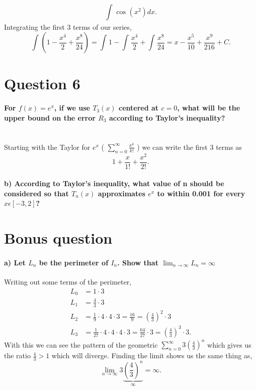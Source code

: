 \documentclass{report}
\begin{document}
\[
\int_{  }^{  } \cos^{  } \left( x^2 \right) dx
.\] 
Integrating the first 3 terms of our series,
\[
\int_{  }^{  } \left( 1- \frac{ x^{ 4 } }{ 2 } + \frac{ x^{ 8 } }{ 24 } \right) = \int_{  }^{  } 1 - \int_{  }^{  } \frac{ x^{ 4 } }{ 2 } + \int_{  }^{  } \frac{ x^{ 8 } }{ 24 } = x - \frac{ x^{ 5 } }{ 10 } + \frac{ x^{ 9 } }{ 216 } + C 
.\] 
\section*{Question 6}%
\label{sec:Question 6}
\paragraph{For $ f\left( x \right) =e^{ x } $, if we use $ T_3\left( x \right)  $ centered at $ c=0 $, what will be the upper bound on the error $ R_3 $ according to Taylor's inequality? \\ \\}
Starting with the Taylor for $ e^{ x } $ ( $ \sum_{ n=0 } ^{ \infty } \frac{ x^{ k } }{ k! } $ ) we can write the first 3 terms as 
\[
1+\frac{ x }{ 1! } +\frac{ x^2 }{ 2! } 
.\] 
\paragraph{b) According to Taylor's inequality, what value of n should be considered so that $ T_n\left( x \right)  $ approximates $ e^{ x } $ to within 0.001 for every $ x \epsilon\left[ -3,2 \right]  $?}
\newpage
\section*{Bonus question}%
\paragraph{a) Let $ L_n $ be the perimeter of $ I_n $. Show that $ \lim_{ n \to \infty} L_n = \infty$}
Writing out some terms of the perimeter, 
\begin{align*}
	L_0  &= 1\cdot 3 \\
	L_1 &= \frac{ 4 }{ 3 } \cdot 3 \\
	L_2 &= \frac{ 1 }{ 9 } \cdot 4\cdot 4\cdot 3=\frac{ 16 }{ 9 } =\left( \frac{ 4 }{ 3 }  \right) ^2 \cdot 3 \\
	L_3 &= \frac{ 1 }{ 27 } \cdot 4\cdot 4\cdot 4\cdot 3= \frac{ 64 }{ 27 } \cdot 3 = \left( \frac{ 4 }{ 3 }  \right) ^3\cdot 3
.\end{align*}
With this we can see the pattern of the geometric $ \sum_{ n=0 } ^{ \infty } 3\left( \frac{ 4 }{ 3 }  \right) ^{ n } $ which gives us the ratio $ \frac{ 4 }{ 3 } >1 $ which will diverge. Finding the limit shows us the same thing as,
\[
\lim_{ n \to \infty} 3 \underbrace{ \left( \frac{ 4 }{ 3 }  \right) ^{ n } }_{ \infty } = \infty
.\] 
\end{document}
